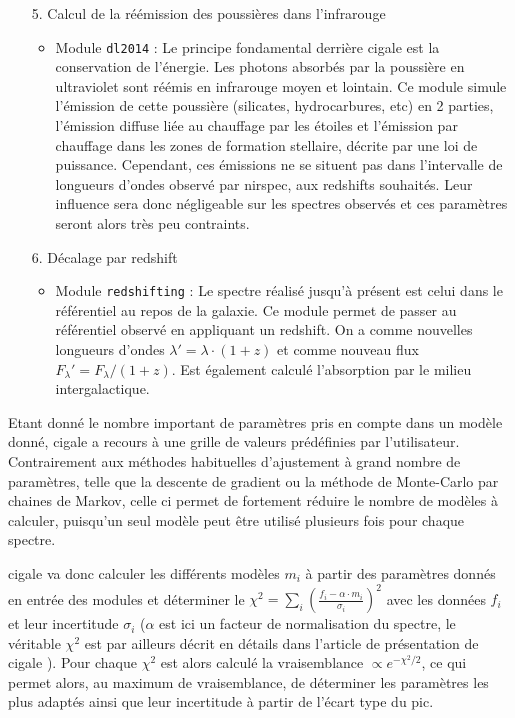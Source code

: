 \documentclass[11pt, a4paper]{article}
\begin{document}
\begin{itemize}
  \item[5.] Calcul de la réémission des poussières dans l'infrarouge
  \begin{itemize}
    \item Module \texttt{dl2014} : Le principe fondamental derrière \gls{cigale} est la conservation de l'énergie. Les photons absorbés par la poussière en ultraviolet sont réémis en infrarouge moyen et lointain. Ce module simule l'émission de cette poussière (silicates, hydrocarbures, etc) en 2 parties, l'émission diffuse liée au chauffage par les étoiles et l'émission par chauffage dans les zones de formation stellaire, décrite par une loi de puissance. Cependant, ces émissions ne se situent pas dans l'intervalle de longueurs d'ondes observé par \gls{nirspec}, aux redshifts souhaités. Leur influence sera donc négligeable sur les spectres observés et ces paramètres seront alors très peu contraints.
    
  \end{itemize}
  \item[6.] Décalage par redshift
  \begin{itemize}
    \item Module \texttt{redshifting} : Le spectre réalisé jusqu'à présent est celui dans le référentiel au repos de la galaxie. Ce module permet de passer au référentiel observé en appliquant un redshift. On a comme nouvelles longueurs d'ondes $\lambda' = \lambda \cdot (1+z)$ et comme nouveau flux $F_\lambda' = F_\lambda / (1+z)$. Est également calculé l'absorption par le milieu intergalactique.
  
  \end{itemize}
\end{itemize}

Etant donné le nombre important de paramètres pris en compte dans un modèle donné, \gls{cigale} a recours à une grille de valeurs prédéfinies par l'utilisateur. Contrairement aux méthodes habituelles d'ajustement à grand nombre de paramètres, telle que la descente de gradient ou la méthode de Monte-Carlo par chaines de Markov, celle ci permet de fortement réduire le nombre de modèles à calculer, puisqu'un seul modèle peut être utilisé plusieurs fois pour chaque spectre.

\gls{cigale} va donc calculer les différents modèles $m_i$ à partir des paramètres donnés en entrée des modules et déterminer le $\chi^2 = \sum_{i} (\frac{f_i - \alpha \cdot m_i}{\sigma_i})^2$ avec les données $f_i$ et leur incertitude $\sigma_i$ ($\alpha$ est ici un facteur de normalisation du spectre, le véritable $\chi^2$ est par ailleurs décrit en détails dans l'article de présentation de \gls{cigale} \parencite{cigale}). Pour chaque $\chi^2$ est alors calculé la vraisemblance $\propto e^{-\chi^2 / 2}$, ce qui permet alors, au maximum de vraisemblance, de déterminer les paramètres les plus adaptés ainsi que leur incertitude à partir de l'écart type du pic.\\
\end{document}
